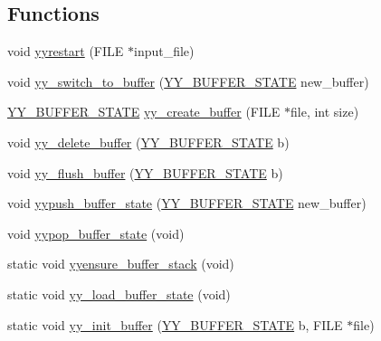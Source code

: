\subsection*{Functions}
\begin{DoxyCompactItemize}
\item 
void \hyperlink{_genesys_09_09-scanner_8cpp_ab657ddef65d43cc3ab8dfc2cad0ac5b8}{yyrestart} (F\-I\-L\-E $\ast$input\-\_\-file)
\item 
void \hyperlink{_genesys_09_09-scanner_8cpp_a3098c48a74ef8fd852f7dd4b3331cbce}{yy\-\_\-switch\-\_\-to\-\_\-buffer} (\hyperlink{_genesys_09_09-scanner_8cpp_a4e5bd2d129903df83f3d13effaf8f3e4}{Y\-Y\-\_\-\-B\-U\-F\-F\-E\-R\-\_\-\-S\-T\-A\-T\-E} new\-\_\-buffer)
\item 
\hyperlink{_genesys_09_09-scanner_8cpp_a4e5bd2d129903df83f3d13effaf8f3e4}{Y\-Y\-\_\-\-B\-U\-F\-F\-E\-R\-\_\-\-S\-T\-A\-T\-E} \hyperlink{_genesys_09_09-scanner_8cpp_a5bc6f1a5f7812508f425b08283f13ae8}{yy\-\_\-create\-\_\-buffer} (F\-I\-L\-E $\ast$file, int size)
\item 
void \hyperlink{_genesys_09_09-scanner_8cpp_ae6ac796aa6c45d433a4b89bf45e6e9dc}{yy\-\_\-delete\-\_\-buffer} (\hyperlink{_genesys_09_09-scanner_8cpp_a4e5bd2d129903df83f3d13effaf8f3e4}{Y\-Y\-\_\-\-B\-U\-F\-F\-E\-R\-\_\-\-S\-T\-A\-T\-E} b)
\item 
void \hyperlink{_genesys_09_09-scanner_8cpp_a2f59cc88e85e5455c62e4ef7ce095ea8}{yy\-\_\-flush\-\_\-buffer} (\hyperlink{_genesys_09_09-scanner_8cpp_a4e5bd2d129903df83f3d13effaf8f3e4}{Y\-Y\-\_\-\-B\-U\-F\-F\-E\-R\-\_\-\-S\-T\-A\-T\-E} b)
\item 
void \hyperlink{_genesys_09_09-scanner_8cpp_a4bf8969e5234aef8b46cce9a67a62724}{yypush\-\_\-buffer\-\_\-state} (\hyperlink{_genesys_09_09-scanner_8cpp_a4e5bd2d129903df83f3d13effaf8f3e4}{Y\-Y\-\_\-\-B\-U\-F\-F\-E\-R\-\_\-\-S\-T\-A\-T\-E} new\-\_\-buffer)
\item 
void \hyperlink{_genesys_09_09-scanner_8cpp_a6201ab6be4687a1ebc3120602d05e35a}{yypop\-\_\-buffer\-\_\-state} (void)
\item 
static void \hyperlink{_genesys_09_09-scanner_8cpp_a2e9898ec03e594f5a82387c787776ef6}{yyensure\-\_\-buffer\-\_\-stack} (void)
\item 
static void \hyperlink{_genesys_09_09-scanner_8cpp_ac6bf96bd2d347c04367b8111abcd0dca}{yy\-\_\-load\-\_\-buffer\-\_\-state} (void)
\item 
static void \hyperlink{_genesys_09_09-scanner_8cpp_af4a399540c15d953f8b01085bfdc93ea}{yy\-\_\-init\-\_\-buffer} (\hyperlink{_genesys_09_09-scanner_8cpp_a4e5bd2d129903df83f3d13effaf8f3e4}{Y\-Y\-\_\-\-B\-U\-F\-F\-E\-R\-\_\-\-S\-T\-A\-T\-E} b, F\-I\-L\-E $\ast$file)

\end{DoxyCompactItemize}
